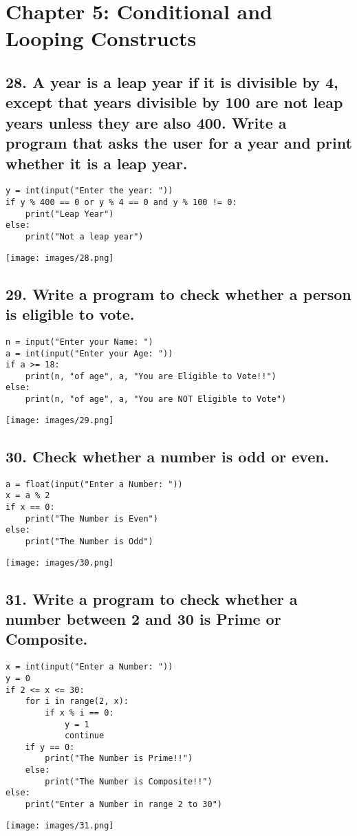 \documentclass[12pt]{article}
\begin{document}
\section*{Chapter 5: Conditional and Looping Constructs}

\subsection*{28. A year is a leap year if it is divisible by 4, except that years divisible by 100 are not leap years unless they are also 400. Write a program that asks the user for a year and print whether it is a leap year.}
\begin{verbatim}
y = int(input("Enter the year: "))
if y % 400 == 0 or y % 4 == 0 and y % 100 != 0:
    print("Leap Year")
else:
    print("Not a leap year")
\end{verbatim}
\texttt{[image: images/28.png]}

\subsection*{29. Write a program to check whether a person is eligible to vote.}
\begin{verbatim}
n = input("Enter your Name: ")
a = int(input("Enter your Age: "))
if a >= 18:
    print(n, "of age", a, "You are Eligible to Vote!!")
else:
    print(n, "of age", a, "You are NOT Eligible to Vote")
\end{verbatim}
\texttt{[image: images/29.png]}

\subsection*{30. Check whether a number is odd or even.}
\begin{verbatim}
a = float(input("Enter a Number: "))
x = a % 2
if x == 0:
    print("The Number is Even")
else:
    print("The Number is Odd")
\end{verbatim}
\texttt{[image: images/30.png]}

\subsection*{31. Write a program to check whether a number between 2 and 30 is Prime or Composite.}
\begin{verbatim}
x = int(input("Enter a Number: "))
y = 0
if 2 <= x <= 30:
    for i in range(2, x):
        if x % i == 0:
            y = 1
            continue
    if y == 0:
        print("The Number is Prime!!")
    else:
        print("The Number is Composite!!")
else:
    print("Enter a Number in range 2 to 30")
\end{verbatim}
\texttt{[image: images/31.png]}
\end{document}
